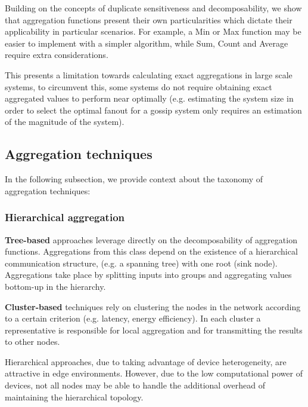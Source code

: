 Building on the concepts of duplicate sensitiveness and decomposability, we show that aggregation functions present their own particularities which dictate their applicability in particular scenarios. For example, a Min or Max function may be easier to implement with a simpler algorithm, while Sum, Count and Average require extra considerations. 

This presents a limitation towards calculating exact aggregations in large scale systems, to circumvent this, some systems do not require obtaining exact aggregated values to perform near optimally (e.g. estimating the system size in order to select the optimal fanout for a gossip system only requires an estimation of the magnitude of the system). 

\subsection{Aggregation techniques}

In the following subsection, we provide context about the taxonomy of aggregation techniques:

\subsubsection*{Hierarchical aggregation}

\textbf{Tree-based} approaches leverage directly on the decomposability of aggregation functions. Aggregations from this class depend on the existence of a hierarchical communication structure, (e.g. a spanning tree) with one root (sink node). Aggregations take place by splitting inputs into groups and aggregating values bottom-up in the hierarchy. 


\textbf{Cluster-based} techniques rely on clustering the nodes in the network according to a certain criterion (e.g. latency, energy efficiency). In each cluster a representative is responsible for local aggregation and for transmitting the results to other nodes. 

Hierarchical approaches, due to taking advantage of device heterogeneity, are attractive in edge environments. However, due to the low computational power of devices, not all nodes may be able to handle the additional overhead of maintaining the hierarchical topology.


